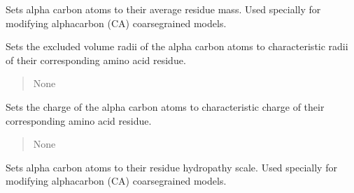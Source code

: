 \documentclass[letterpaper,10pt,english]{sphinxmanual}
\begin{document}
\begin{fulllineitems}

\begin{fulllineitems}
\label{\detokenize{modules/system:hps.core.system.setCARadiusPerResidueType}}
\pysigstartsignatures
{}
\pysigstopsignatures
\sphinxAtStartPar
Sets alpha carbon atoms to their average residue mass. Used specially for
modifying alpha\sphinxhyphen{}carbon (CA) coarse\sphinxhyphen{}grained models.

\sphinxAtStartPar
Sets the excluded volume radii of the alpha carbon atoms
to characteristic radii of their corresponding amino acid
residue.
\begin{quote}\begin{description}
\sphinxAtStartPar
None

\end{description}\end{quote}

\end{fulllineitems}


\begin{fulllineitems}
\label{\detokenize{modules/system:hps.core.system.setCAChargePerResidueType}}
\pysigstartsignatures
{}
\pysigstopsignatures
\sphinxAtStartPar
Sets the charge of the alpha carbon atoms
to characteristic charge of their corresponding amino acid
residue.
\begin{quote}\begin{description}
\sphinxAtStartPar
None

\end{description}\end{quote}

\end{fulllineitems}


\begin{fulllineitems}
\label{\detokenize{modules/system:hps.core.system.setCAHPSPerResidueType}}
\pysigstartsignatures
{}
\pysigstopsignatures
\sphinxAtStartPar
Sets alpha carbon atoms to their residue hydropathy scale. Used specially for
modifying alpha\sphinxhyphen{}carbon (CA) coarse\sphinxhyphen{}grained models.


\end{fulllineitems}
\end{fulllineitems}
\end{document}
